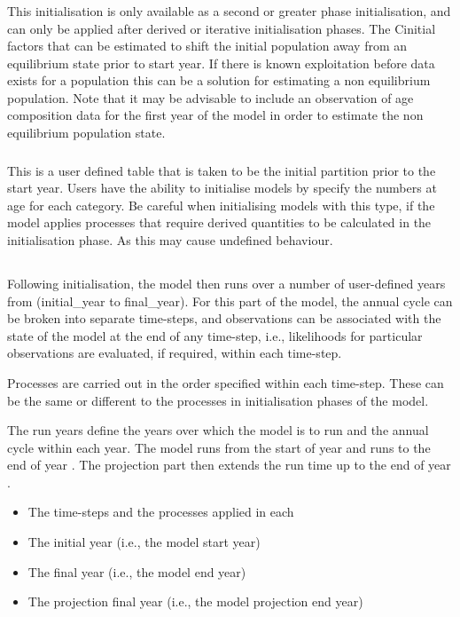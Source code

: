 \subsubsection*{}

This initialisation is only available as a second or greater phase initialisation, and can only be applied after derived or iterative initialisation phases. The Cinitial factors that can be estimated to shift the initial population away from an equilibrium state prior to start year. If there is known exploitation before data exists for a population this can be a solution for estimating a non equilibrium population. Note that it may be advisable to include an observation of age composition data for the first year of the model in order to estimate the non equilibrium population state. 

\subsubsection*{}

This is a user defined table that is taken to be the initial partition prior to the start year. Users have the ability to initialise models by specify the numbers at age for each category. Be careful when initialising models with this type, if the model applies processes that require derived quantities to be calculated in the initialisation phase. As this may cause undefined behaviour.

\subsection{}

Following initialisation, the model then runs over a number of user-defined years from (initial\_year to final\_year). For this part of the model, the annual cycle can be broken into separate time-steps, and observations can be associated with the state of the model at the end of any time-step, i.e., likelihoods for particular observations are evaluated, if required, within each time-step. 

Processes are carried out in the order specified within each time-step. These can be the same or different to the processes in initialisation phases of the model. 

The run years define the years over which the model is to run and the annual cycle within each year. The model runs from the start of year  and runs to the end of year . The projection part then extends the run time up to the end of year . 
\begin{itemize}
  \item The time-steps and the processes applied in each
  \item The initial year (i.e., the model start year)
  \item The final year (i.e., the model end year)
  \item The projection final year (i.e., the model projection end year)
\end{itemize}

